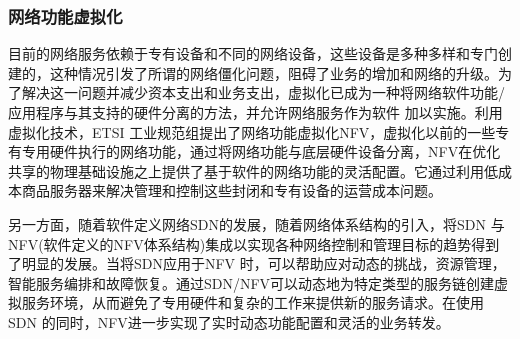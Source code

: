 \subsubsection{网络功能虚拟化}
目前的网络服务依赖于专有设备和不同的网络设备，这些设备是多种多样和专门创建的\cite{sherry2012making,wang2011untold,walfish2004middleboxes}，这种情况引发了所谓的网络僵化问题\cite{hawilo2014nfv}，阻碍了业务的增加和网络的升级。为了解决这一问题并减少资本支出和业务支出，虚拟化已成为一种将网络软件功能/应用程序与其支持的硬件分离的方法，并允许网络服务作为软件\cite{schaffrath2009network,chowdhury2010survey,chowdhury2009network} 加以实施。利用虚拟化技术，ETSI 工业规范组提出了网络功能虚拟化NFV，虚拟化以前的一些专有专用硬件执行的网络功能\cite{chiosi2012network,yue2013network}，通过将网络功能与底层硬件设备分离，NFV在优化共享的物理基础设施之上提供了基于软件的网络功能的灵活配置。它通过利用低成本商品服务器来解决管理和控制这些封闭和专有设备的运营成本问题。

另一方面，随着软件定义网络SDN的发展，随着网络体系结构\cite{manzalini2014software,yeganeh2013scalability,ge20145g}的引入，将SDN 与NFV(软件定义的NFV体系结构)集成以实现各种网络控制和管理目标的趋势得到了明显的发展。当将SDN应用于NFV 时，可以帮助应对动态的挑战，资源管理，智能服务编排和故障恢复。通过SDN/NFV可以动态地为特定类型的服务链创建虚拟服务环境，从而避免了专用硬件和复杂的工作来提供新的服务请求。在使用SDN 的同时，NFV进一步实现了实时动态功能配置和灵活的业务转发。






